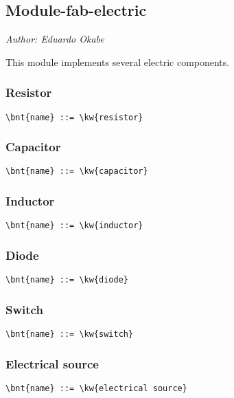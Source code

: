 \subsection{Module-fab-electric}
\emph{Author: Eduardo Okabe}

\noindent
This module implements several electric components.

\subsubsection{Resistor}
\begin{Verbatim}[commandchars=\\\{\}]
    \bnt{name} ::= \kw{resistor}
\end{Verbatim}

\subsubsection{Capacitor}
\begin{Verbatim}[commandchars=\\\{\}]
    \bnt{name} ::= \kw{capacitor}
\end{Verbatim}

\subsubsection{Inductor}
\begin{Verbatim}[commandchars=\\\{\}]
    \bnt{name} ::= \kw{inductor}
\end{Verbatim}

\subsubsection{Diode}
\begin{Verbatim}[commandchars=\\\{\}]
    \bnt{name} ::= \kw{diode}
\end{Verbatim}

\subsubsection{Switch}
\begin{Verbatim}[commandchars=\\\{\}]
    \bnt{name} ::= \kw{switch}
\end{Verbatim}

\subsubsection{Electrical source}
\begin{Verbatim}[commandchars=\\\{\}]
    \bnt{name} ::= \kw{electrical source}
\end{Verbatim}

